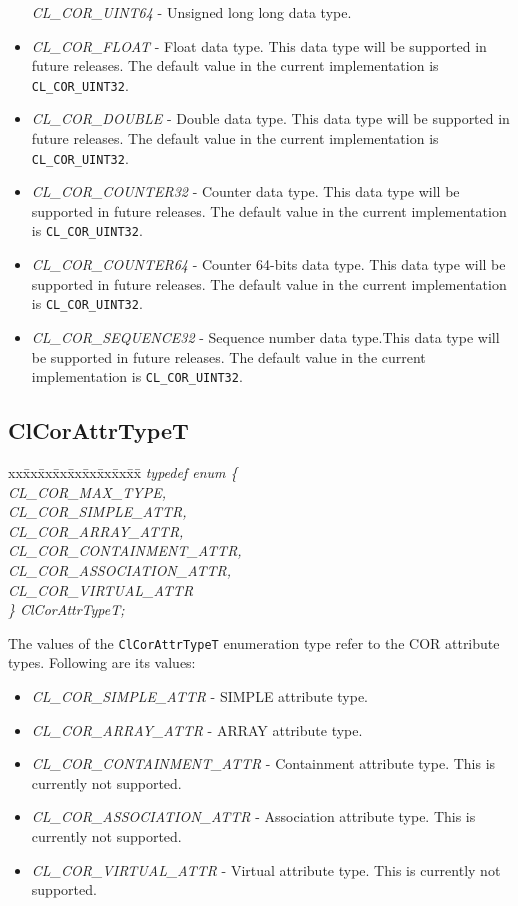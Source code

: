 \begin{flushleft}
\begin{itemize}
\textit{  CL\_\-COR\_\-UINT64} - Unsigned long long data type.
\item
\textit{  CL\_\-COR\_\-FLOAT} - Float data type. This data type will be supported in future releases. The default value in the current implementation  
is {\tt{CL\_\-COR\_\-UINT32}}.
\item
\textit{  CL\_\-COR\_\-DOUBLE} - Double data type. This data type will be supported in future releases. The default value in the current implementation is
{\tt{CL\_\-COR\_\-UINT32}}.
\item
\textit{    CL\_\-COR\_\-COUNTER32} - Counter data type. This data type will be supported in future releases. The default value in the current 
implementation is {\tt{CL\_\-COR\_\-UINT32}}.
\item
\textit{  CL\_\-COR\_\-COUNTER64} -  Counter 64-bits data type. This data type will be supported in future releases. The default value in the current 
implementation is {\tt{CL\_\-COR\_\-UINT32}}.
\item
\textit{    CL\_\-COR\_\-SEQUENCE32} -  Sequence number data type.This data type will be supported in future releases. The default value in the current 
implementation is {\tt{CL\_\-COR\_\-UINT32}}.
\end{itemize}


\subsection{ClCorAttrTypeT}

\begin{tabbing}
xx\=xx\=xx\=xx\=xx\=xx\=xx\=xx\=xx\=\kill
\textit{typedef enum \{}\\
\>\>\>\>\textit{CL\_COR\_MAX\_TYPE,}\\
\>\>\>\>\textit{CL\_COR\_SIMPLE\_ATTR,}\\
\>\>\>\>\textit{CL\_COR\_ARRAY\_ATTR,}\\
\>\>\>\>\textit{CL\_COR\_CONTAINMENT\_ATTR,}\\
\>\>\>\>\textit{CL\_COR\_ASSOCIATION\_ATTR,}\\
\>\>\>\>\textit{CL\_COR\_VIRTUAL\_ATTR}\\
\textit{\} ClCorAttrTypeT;}\end{tabbing}
The values of the {\tt{ClCorAttrTypeT}} enumeration type refer to the COR attribute types. Following are its values:
\begin{itemize}
\item
\textit{CL\_COR\_SIMPLE\_ATTR} - SIMPLE attribute type.
\item
\textit{CL\_COR\_ARRAY\_ATTR} - ARRAY attribute type.
\item
\textit{CL\_COR\_CONTAINMENT\_ATTR} - Containment attribute type. This is currently not supported.
\item
\textit{CL\_COR\_ASSOCIATION\_ATTR} - Association attribute type. This is currently not supported.
\item
\textit{CL\_COR\_VIRTUAL\_ATTR} - Virtual attribute type. This is currently not supported.
\end{itemize}






\end{flushleft}
